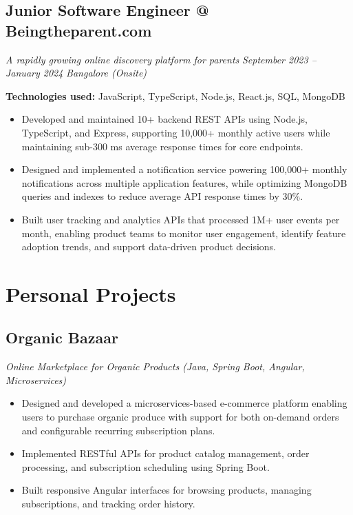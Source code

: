\documentclass[a4paper]{article}
\begin{document}
\subsection{Junior Software Engineer @ Beingtheparent.com}
\textit{A rapidly growing online discovery platform for parents}
\hfill
\textit{September 2023 -- January 2024}
\textbar
\textit{ Bangalore (Onsite)}

\vspace{3pt}
\textbf{Technologies used:}
JavaScript, TypeScript, Node.js, React.js, SQL, MongoDB
\begin{itemize}
	\item Developed and maintained 10+ backend REST APIs using Node.js, TypeScript, and Express, supporting 10,000+ monthly active users while maintaining sub-300 ms average response times for core endpoints.
	\item Designed and implemented a notification service powering 100,000+ monthly notifications across multiple application features, while optimizing MongoDB queries and indexes to reduce average API response times by 30\%.
	\item Built user tracking and analytics APIs that processed 1M+ user events per month, enabling product teams to monitor user engagement, identify feature adoption trends, and support data-driven product decisions.
\end{itemize}


\section{Personal Projects}
\subsection{Organic Bazaar}
\textit{Online Marketplace for Organic Products (Java, Spring Boot, Angular, Microservices)}
\hfill
\href{https://github.com/jatinkumar-me/organic-bazaar}{\faLink}

\begin{itemize}
	\item Designed and developed a microservices-based e-commerce platform enabling users to purchase organic produce with support for both on-demand orders and configurable recurring subscription plans.
	\item Implemented RESTful APIs for product catalog management, order processing, and subscription scheduling using Spring Boot.
	\item Built responsive Angular interfaces for browsing products, managing subscriptions, and tracking order history.
\end{itemize}
\end{document}
